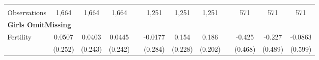 \begin{landscape}
\begin{table}[htpb!]
\begin{center}
\begin{tabular}{lcccp{2mm}cccp{2mm}ccc}
\begin{footnotesize}\end{footnotesize}&\begin{footnotesize}\end{footnotesize}&\begin{footnotesize}\end{footnotesize}&\begin{footnotesize}\end{footnotesize}&\begin{footnotesize}\end{footnotesize}&\begin{footnotesize}\end{footnotesize}&\begin{footnotesize}\end{footnotesize}&\begin{footnotesize}\end{footnotesize}&\begin{footnotesize}\end{footnotesize}&\begin{footnotesize}\end{footnotesize}&\begin{footnotesize}\end{footnotesize}&\begin{footnotesize}\end{footnotesize}\\Observations&1,664&1,664&1,664&&1,251&1,251&1,251&&571&571&571\\
\multicolumn{12}{l}{\textbf{Girls OmitMissing}}\\ 
Fertility&0.0507&0.0403&0.0445&&-0.0177&0.154&0.186&&-0.425&-0.227&-0.0863\\
&(0.252)&(0.243)&(0.242)&&(0.284)&(0.228)&(0.202)&&(0.468)&(0.489)&(0.599)\\

\end{tabular}
\end{center}
\end{table}
\end{landscape}
